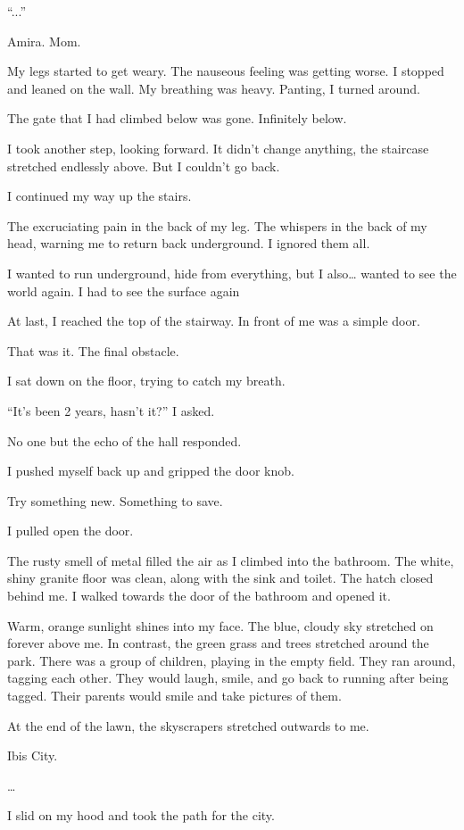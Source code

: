 “...”

Amira. Mom.

My legs started to get weary. The nauseous feeling was getting worse. I stopped and leaned on the wall. My breathing was heavy. Panting, I turned around.

The gate that I had climbed below was gone. Infinitely below. 

I took another step, looking forward. It didn’t change anything, the staircase stretched endlessly above. But I couldn’t go back. 

I continued my way up the stairs.

The excruciating pain in the back of my leg. The whispers in the back of my head, warning me to return back underground. I ignored them all.

I wanted to run underground, hide from everything, but I also… wanted to see the world again. I had to see the surface again

At last, I reached the top of the stairway. In front of me was a simple door. 

That was it. The final obstacle.

I sat down on the floor, trying to catch my breath.

“It’s been 2 years, hasn’t it?” I asked. 

No one but the echo of the hall responded.

I pushed myself back up and gripped the door knob.

Try something new. Something to save.

I pulled open the door. 

The rusty smell of metal filled the air as I climbed into the bathroom. The white, shiny granite floor was clean, along with the sink and toilet. The hatch closed behind me. I walked towards the door of the bathroom and opened it.

Warm, orange sunlight shines into my face. The blue, cloudy sky stretched on forever above me. In contrast, the green grass and trees stretched around the park. There was a group of children, playing in the empty field. They ran around, tagging each other. They would laugh, smile, and go back to running after being tagged. Their parents would smile and take pictures of them.

At the end of the lawn, the skyscrapers stretched outwards to me. 

Ibis City.

…

I slid on my hood and took the path for the city.

